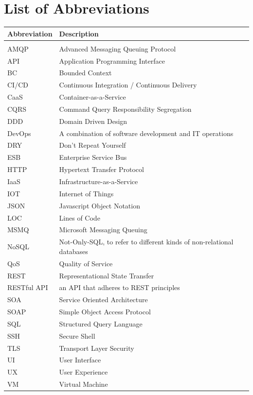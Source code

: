 \documentclass{Configuration_Files/PoliMi3i_thesis}
\begin{document}
\listoffigures

\listoftables

\chapter*{List of Abbreviations}
\begin{table}[H]
    \centering
    \begin{tabular}{ll}
        \textbf{Abbreviation} & \textbf{Description} \\\hline\\[-9px]
        AMQP & Advanced Messaging Queuing Protocol \\[2px]
        API & Application Programming Interface \\[2px]
        BC & Bounded Context \\[2px]
        CI/CD & Continuous Integration / Continuous Delivery \\[2px]
        CaaS & Container-as-a-Service \\[2px]
        CQRS & Command Query Responsibility Segregation \\[2px]
        DDD & Domain Driven Design \\[2px]
        DevOps & A combination of software development and IT operations \\[2px]
        DRY & Don't Repeat Yourself \\[2px]
        ESB & Enterprise Service Bus \\[2px]
        HTTP & Hypertext Transfer Protocol \\[2px]
        IaaS & Infrastructure-as-a-Service \\[2px]
        IOT & Internet of Things \\[2px]
        JSON & Javascript Object Notation \\[2px]
        LOC & Lines of Code \\[2px]
        MSMQ & Microsoft Messaging Queuing \\[2px]
        NoSQL & Not-Only-SQL, to refer to different kinds of non-relational databases \\[2px]
        QoS & Quality of Service \\[2px]
        REST & Representational State Transfer \\[2px]
        RESTful API & an API that adheres to REST principles \\[2px]
        SOA & Service Oriented Architecture \\[2px]
        SOAP & Simple Object Access Protocol \\[2px]
        SQL & Structured Query Language \\[2px]
        SSH & Secure Shell \\[2px]
        TLS & Transport Layer Security \\[2px]
        UI & User Interface \\[2px]
        UX & User Experience \\[2px]
        VM & Virtual Machine \\[2px]
    \end{tabular}
\end{table}
\end{document}
